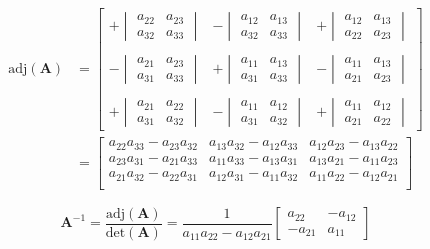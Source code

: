 \begin{small}
    \noindent\begin{align*}
        \mathrm{adj}(\mathbf{A}) & = \begin{bmatrix}
                                         +\begin{vmatrix}a_{22}&a_{23}\\a_{32}&a_{33}\end{vmatrix} & -\begin{vmatrix}a_{12}&a_{13}\\a_{32}&a_{33}\end{vmatrix} & +\begin{vmatrix}a_{12}&a_{13}\\a_{22}&a_{23}\end{vmatrix} \\\\
                                         -\begin{vmatrix}a_{21}&a_{23}\\a_{31}&a_{33}\end{vmatrix} & +\begin{vmatrix}a_{11}&a_{13}\\a_{31}&a_{33}\end{vmatrix} & -\begin{vmatrix}a_{11}&a_{13}\\a_{21}&a_{23}\end{vmatrix} \\\\
                                         +\begin{vmatrix}a_{21}&a_{22}\\a_{31}&a_{32}\end{vmatrix} & -\begin{vmatrix}a_{11}&a_{12}\\a_{31}&a_{32}\end{vmatrix} & +\begin{vmatrix}a_{11}&a_{12}\\a_{21}&a_{22}\end{vmatrix}
                                     \end{bmatrix} \\
                                 & = \begin{bmatrix}
                                         a_{22}a_{33}-a_{23}a_{32} & a_{13}a_{32}-a_{12}a_{33} & a_{12}a_{23}-a_{13}a_{22} \\
                                         a_{23}a_{31}-a_{21}a_{33} & a_{11}a_{33}-a_{13}a_{31} & a_{13}a_{21}-a_{11}a_{23} \\
                                         a_{21}a_{32}-a_{22}a_{31} & a_{12}a_{31}-a_{11}a_{32} & a_{11}a_{22}-a_{12}a_{21} \\
                                     \end{bmatrix}
    \end{align*}
\end{small}

\newpar{}
\begin{equation*}
    \mathbf{A}^{-1} = \frac{\text{adj}(\mathbf{A})}{\text{det}(\mathbf{A})}
    = \frac{1}{a_{11}a_{22} - a_{12}a_{21}}
    \begin{bmatrix}
        a_{22}  & - a_{12} \\
        -a_{21} & a_{11}
    \end{bmatrix}
\end{equation*}